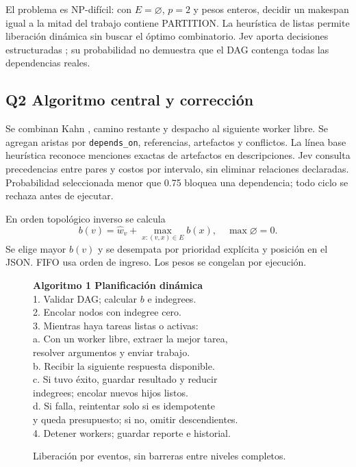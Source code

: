 El problema es NP-difícil: con $E=\varnothing$, $p=2$ y pesos enteros,
decidir un makespan igual a la mitad del trabajo contiene PARTITION.
La heurística de listas permite liberación dinámica sin buscar el
óptimo combinatorio. Jev aporta decisiones estructuradas \cite{jev};
su probabilidad no demuestra que el DAG contenga todas las
dependencias reales.

\subsection{Q2 Algoritmo central y corrección}
Se combinan Kahn \cite{kahn}, camino restante y despacho al siguiente
worker libre. Se agregan aristas por \texttt{depends\_on}, referencias,
artefactos y conflictos. La línea base heurística reconoce menciones
exactas de artefactos en descripciones. Jev consulta precedencias entre
pares y costos por intervalo, sin eliminar relaciones declaradas.
Probabilidad seleccionada menor que 0.75 bloquea una dependencia;
todo ciclo se rechaza antes de ejecutar.

En orden topológico inverso se calcula
\begin{equation}
b(v)=\hat w_v+\max_{x:(v,x)\in E}b(x),\quad \max\varnothing=0.
\end{equation}
Se elige mayor $b(v)$ y se desempata por prioridad explícita y posición
en el JSON. FIFO usa orden de ingreso. Los pesos se congelan por ejecución.

\begin{figure}[!t]
\centering
\begin{minipage}{0.95\columnwidth}\small
\textbf{Algoritmo 1 Planificación dinámica}\\
1. Validar DAG; calcular $b$ e indegrees.\\
2. Encolar nodos con indegree cero.\\
3. Mientras haya tareas listas o activas:\\
\hspace*{.7em} a. Con un worker libre, extraer la mejor tarea,\\
\hspace*{1.6em} resolver argumentos y enviar trabajo.\\
\hspace*{.7em} b. Recibir la siguiente respuesta disponible.\\
\hspace*{.7em} c. Si tuvo éxito, guardar resultado y reducir\\
\hspace*{1.6em} indegrees; encolar nuevos hijos listos.\\
\hspace*{.7em} d. Si falla, reintentar solo si es idempotente\\
\hspace*{1.6em} y queda presupuesto; si no, omitir descendientes.\\
4. Detener workers; guardar reporte e historial.
\end{minipage}
\caption{Liberación por eventos, sin barreras entre niveles completos.}
\end{figure}

